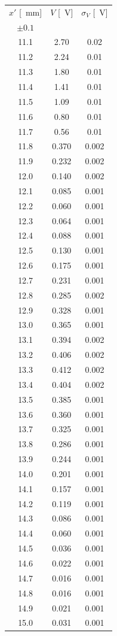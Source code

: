 \documentclass[10pt,oneside,a4paper]{article}
\begin{document}
\begin{minipage}[t]{0.33\linewidth}
\vspace{0cm}
\begin{center}
\begin{tabular}{c|c|c}
$x'$ [\SI{}{mm}] & $V$ [\SI{}{V}] & $\sigma_V$ [\SI{}{V}] \\
 $\pm 0.1$ & & \\
\hline
 11.1 & 2.70 & 0.02 \\
 11.2 & 2.24 & 0.01 \\
 11.3 & 1.80 & 0.01 \\
 11.4 & 1.41 & 0.01 \\
 11.5 & 1.09 & 0.01 \\
 11.6 & 0.80 & 0.01 \\
 11.7 & 0.56 & 0.01 \\
 11.8 & 0.370 & 0.002 \\
 11.9 & 0.232 & 0.002 \\
 12.0 & 0.140 & 0.002 \\
 12.1 & 0.085 & 0.001 \\
 12.2 & 0.060 & 0.001 \\
 12.3 & 0.064 & 0.001 \\
 12.4 & 0.088 & 0.001 \\
 12.5 & 0.130 & 0.001 \\
 12.6 & 0.175 & 0.001 \\
 12.7 & 0.231 & 0.001 \\
 12.8 & 0.285 & 0.002 \\
 12.9 & 0.328 & 0.001 \\
 13.0 & 0.365 & 0.001 \\
 13.1 & 0.394 & 0.002 \\
 13.2 & 0.406 & 0.002 \\
 13.3 & 0.412 & 0.002 \\
 13.4 & 0.404 & 0.002 \\
 13.5 & 0.385 & 0.001 \\
 13.6 & 0.360 & 0.001 \\
 13.7 & 0.325 & 0.001 \\
 13.8 & 0.286 & 0.001 \\
 13.9 & 0.244 & 0.001 \\
 14.0 & 0.201 & 0.001 \\
 14.1 & 0.157 & 0.001 \\
 14.2 & 0.119 & 0.001 \\
 14.3 & 0.086 & 0.001 \\
 14.4 & 0.060 & 0.001 \\
 14.5 & 0.036 & 0.001 \\
 14.6 & 0.022 & 0.001 \\
 14.7 & 0.016 & 0.001 \\
 14.8 & 0.016 & 0.001 \\
 14.9 & 0.021 & 0.001 \\
 15.0 & 0.031 & 0.001 \\
\hline
\end{tabular}
\end{center}
\end{minipage}
\end{document}
